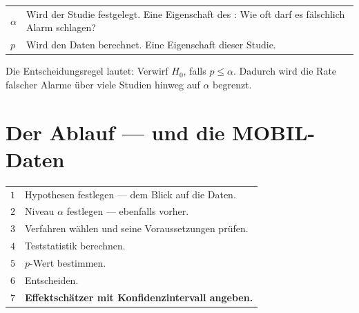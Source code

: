\begin{warnung}
\begin{center}
\renewcommand{\arraystretch}{1.55}
\begin{tabular}{@{}P{1.6cm}P{6.8cm}@{}}
\toprule
$\alpha$ & Wird  der Studie festgelegt. Eine Eigenschaft des : Wie oft darf es fälschlich Alarm schlagen?\\
$p$ & Wird  den Daten berechnet. Eine Eigenschaft dieser  Studie.\\
\bottomrule
\end{tabular}
\end{center}

Die Entscheidungsregel lautet: Verwirf $H_0$, falls $p \le \alpha$. Dadurch wird die Rate falscher Alarme über viele Studien hinweg auf $\alpha$ begrenzt.

\begin{center}
\begin{minipage}{0.88\textwidth}
\end{minipage}
\end{center}
\end{warnung}

\section{Der Ablauf --- und die MOBIL-Daten}

\begin{merksatz}
\begin{center}
\renewcommand{\arraystretch}{1.5}
\begin{tabular}{@{}P{1.0cm}P{7.4cm}@{}}
\toprule
$1$ & Hypothesen festlegen ---  dem Blick auf die Daten.\\
$2$ & Niveau $\alpha$ festlegen --- ebenfalls vorher.\\
$3$ & Verfahren wählen und seine Voraussetzungen prüfen.\\
$4$ & Teststatistik berechnen.\\
$5$ & $p$-Wert bestimmen.\\
$6$ & Entscheiden.\\
$7$ & \textbf{Effektschätzer mit Konfidenzintervall angeben.}\\
\bottomrule
\end{tabular}
\end{center}

\begin{center}
\begin{minipage}{0.88\textwidth}
\end{minipage}
\end{center}
\end{merksatz}


